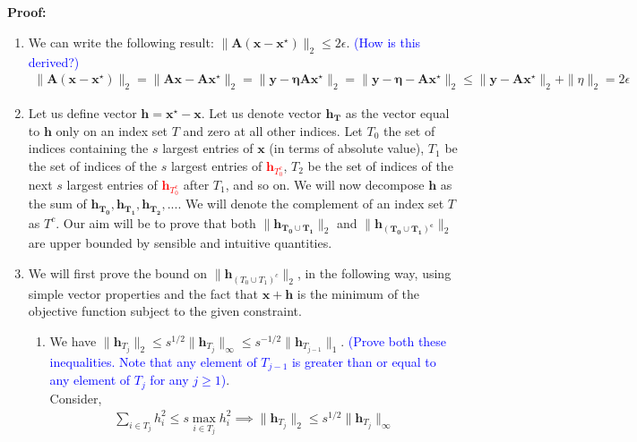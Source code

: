 \documentclass[11pt]{article}
\begin{document}
\\
\\
\textbf{Proof:}
\\
\begin{enumerate}
\item We can write the following result: $\|\mathbf{A(x-x^{\star})}\|_2 \leq 2\epsilon$. \textcolor{blue}{(How is this derived?)}
\begin{eqnarray}\label{part1}
\|\mathbf{A(x-x^{\star})}\|_2 = \|\mathbf{Ax-Ax^{\star}}\|_2 = \|\mathbf{y - \eta Ax^{\star}}\|_2 =  \|\mathbf{y - \eta -Ax^{\star}}\|_2 \leq \|\mathbf{y -Ax^{\star}}\|_2 + \|\eta\|_2 = 2\epsilon
\end{eqnarray}
\item Let us define vector $\mathbf{h} = \mathbf{x^{\star}-x}$. Let us denote vector $\mathbf{h_T}$ as the vector equal to $\mathbf{h}$ only on an index set $T$ and zero at all other indices. Let $T_0$ the set of indices containing the $s$ largest entries of $\mathbf{x}$ (in terms of absolute value), $T_1$ be the set of indices of the $s$ largest entries of  \textcolor{red}{$\mathbf{h}_{T^c_0}$}, $T_2$ be the set of indices of the next $s$ largest entries of \textcolor{red}{$\mathbf{h}_{T^c_0}$} after $T_1$, and so on. We will now decompose $\mathbf{h}$ as the sum of $\mathbf{h_{T_0}}, \mathbf{h_{T_1}}, \mathbf{h_{T_2}}, ...$. We will denote the complement of an index set $T$ as $T^c$. Our aim will be to prove that both $\|\mathbf{h_{T_0 \cup T_1}}\|_2$ and $\|\mathbf{h_{(T_0 \cup T_1)^c}}\|_2$ are upper bounded by sensible and intuitive quantities. 
\item We will first prove the bound on $\|\mathbf{h}_{(T_0 \cup T_1)^c}\|_2$, in the following way, using simple vector properties and the fact that $\mathbf{x+h}$ is the minimum of the objective function subject to the given constraint. 
\begin{enumerate}
\item We have $\|\mathbf{h}_{T_j}\|_2 \leq s^{1/2} \|\mathbf{h}_{T_j}\|_\infty \leq s^{-1/2} \|\mathbf{h}_{T_{j-1}}\|_1$. \textcolor{blue}{(Prove both these inequalities. Note that any element of $T_{j-1}$ is greater than or equal to any element of $T_j$ for any $j \geq 1$)}. \\
Consider,
\begin{eqnarray} \label{part3a}
\sum\limits_{i\in T_{j}} h_{i}^{2} \leq  s\max_{i \in T_{j}} h_{i}^2
\implies \|\mathbf{h}_{T_j}\|_2 \leq s^{1/2} \|\mathbf{h}_{T_j}\|_\infty\\

\end{eqnarray}
\end{enumerate}
\end{enumerate}
\end{document}
